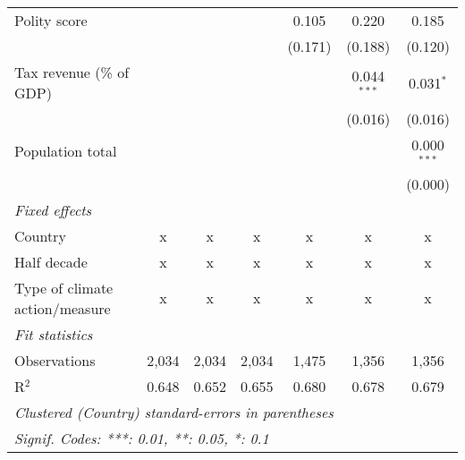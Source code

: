 \begin{tabular}{lcccccc}
   Polity score                                                    &              &                &                & 0.105          & 0.220          & 0.185\\   
                                                                   &              &                &                & (0.171)        & (0.188)        & (0.120)\\   
   Tax revenue (\% of GDP)                                         &              &                &                &                & 0.044$^{***}$  & 0.031$^{*}$\\   
                                                                   &              &                &                &                & (0.016)        & (0.016)\\   
   Population total                                                &              &                &                &                &                & 0.000$^{***}$\\   
                                                                   &              &                &                &                &                & (0.000)\\   
   \emph{Fixed effects}\\
   Country                                                         & x            & x              & x              & x              & x              & x\\  
   Half decade                                                     & x            & x              & x              & x              & x              & x\\  
   Type of climate action/measure                                  & x            & x              & x              & x              & x              & x\\  
   \midrule \emph{Fit statistics}\\
   Observations                                                    & 2,034        & 2,034          & 2,034          & 1,475          & 1,356          & 1,356\\  
   R$^2$                                                           & 0.648        & 0.652          & 0.655          & 0.680          & 0.678          & 0.679\\  
   \midrule
   \multicolumn{7}{l}{\emph{Clustered (Country) standard-errors in parentheses}}\\
   \multicolumn{7}{l}{\emph{Signif. Codes: ***: 0.01, **: 0.05, *: 0.1}}\\
\end{tabular}
\par\endgroup


